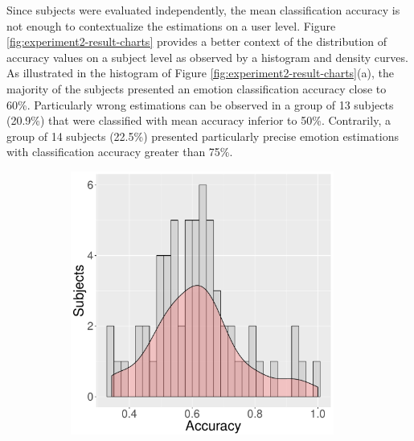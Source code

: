 Since subjects were evaluated independently, the mean classification accuracy is not enough to contextualize the estimations on a user level. Figure \ref{fig:experiment2-result-charts} provides a better context of the distribution of accuracy values on a subject level as observed by a histogram and density curves. As illustrated in the histogram of Figure \ref{fig:experiment2-result-charts}(a), the majority of the subjects presented an emotion classification accuracy close to 60\%. Particularly wrong estimations can be observed in a group of 13 subjects (20.9\%) that were classified with mean accuracy inferior to 50\%. Contrarily, a group of 14 subjects (22.5\%) presented particularly precise emotion estimations with classification accuracy greater than 75\%.

\begin{figure}[ht]
\centering
  \begin{subfigure}[b]{0.5\textwidth}
    \includegraphics[width=0.95\textwidth]{Content/figures/experiment2-hist-user}
    \caption{}
    \label{fig:experiment2-chart-hist}
  \end{subfigure}%
  \begin{subfigure}[b]{0.5\textwidth}
    \centering

\end{subfigure}
\end{figure}
